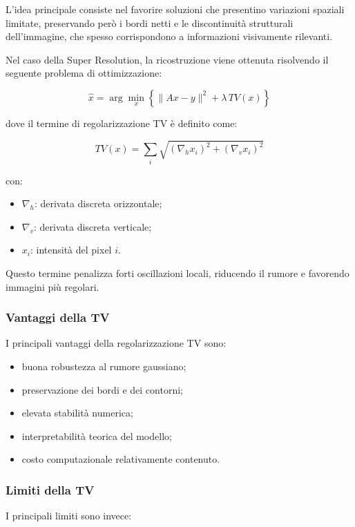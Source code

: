 \documentclass{article}
\begin{document}
L’idea principale consiste nel favorire soluzioni che presentino variazioni spaziali limitate, preservando però i bordi netti e le discontinuità strutturali dell’immagine, che spesso corrispondono a informazioni visivamente rilevanti.

Nel caso della Super Resolution, la ricostruzione viene ottenuta risolvendo il seguente problema di ottimizzazione:

\[
\hat{x}
=
\arg\min_x
\left\{
\|Ax - y\|^2
+
\lambda \, TV(x)
\right\}
\]

dove il termine di regolarizzazione TV è definito come:

\[
TV(x)
=
\sum_{i}
\sqrt{
(\nabla_h x_i)^2 +
(\nabla_v x_i)^2
}
\]

con:

\begin{itemize}
    \item \(\nabla_h\): derivata discreta orizzontale;
    \item \(\nabla_v\): derivata discreta verticale;
    \item \(x_i\): intensità del pixel \(i\).
\end{itemize}

Questo termine penalizza forti oscillazioni locali, riducendo il rumore e favorendo immagini più regolari.

\subsubsection{Vantaggi della TV}

I principali vantaggi della regolarizzazione TV sono:

\begin{itemize}
    \item buona robustezza al rumore gaussiano;
    \item preservazione dei bordi e dei contorni;
    \item elevata stabilità numerica;
    \item interpretabilità teorica del modello;
    \item costo computazionale relativamente contenuto.
\end{itemize}

\subsubsection{Limiti della TV}

I principali limiti sono invece:
\end{document}
